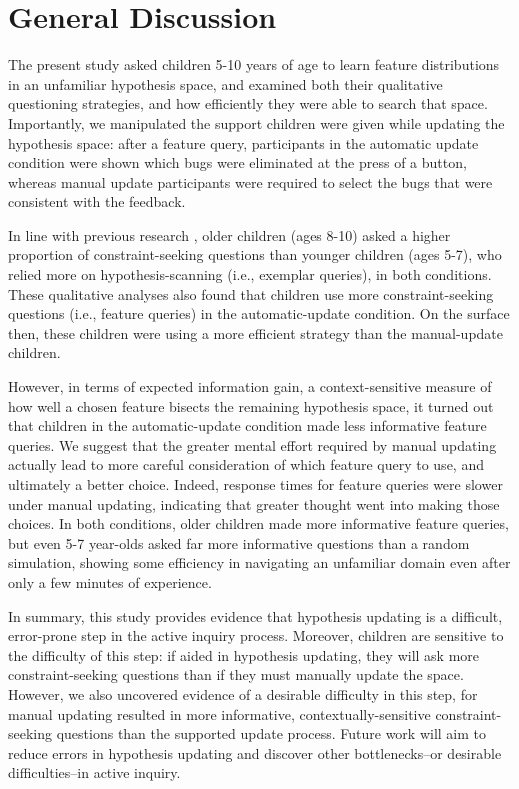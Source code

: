 \documentclass[10pt,letterpaper]{article}
\begin{document}
\vspace{-.2cm}
\section{General Discussion}
\vspace{-.1cm}
The present study asked children 5-10 years of age to learn feature distributions in an unfamiliar hypothesis space, and examined both their qualitative questioning strategies, and how efficiently they were able to search that space. Importantly, we manipulated the support children were 
given while updating the hypothesis space: after a feature query, participants in the 
automatic update condition were shown which bugs were eliminated at the press of 
a button, whereas manual update participants were required to select the bugs that 
were consistent with the feedback. 

In line with previous research \cite{Mosher:1966,Ruggeri:2014}, older children (ages 8-10) asked a higher proportion of constraint-seeking questions than younger children (ages 5-7), who relied more on hypothesis-scanning (i.e., exemplar queries), in both conditions. These qualitative analyses also found that children use more constraint-seeking questions (i.e., feature queries) in the automatic-update condition. On the surface then, these children were using a more efficient strategy than the manual-update children. 

However, in terms of expected information gain, a context-sensitive measure of how well a chosen feature bisects the remaining hypothesis space, it turned out that children in the 
automatic-update condition made less informative feature queries. We 
suggest that the greater mental effort required by manual updating actually lead 
to more careful consideration of which feature query to use, and ultimately a better choice. Indeed, response times for feature queries were slower under manual updating, indicating that greater thought went into making those choices. In both conditions, older children made more informative feature queries, but even 5-7 year-olds asked far more informative questions than a random simulation, showing some efficiency in navigating an unfamiliar domain even after only a few minutes of experience. 

In summary, this study provides evidence that hypothesis updating is a difficult, error-prone step in the active inquiry process. Moreover, children are sensitive to the difficulty of this step: if aided in hypothesis updating, they will ask more constraint-seeking questions than if they must manually update the space. However, we also uncovered evidence of a desirable difficulty in this step, for manual updating resulted in more informative, contextually-sensitive constraint-seeking questions than the supported update process. Future work will aim to reduce errors in hypothesis updating and discover other bottlenecks--or desirable difficulties--in active inquiry.
\end{document}
